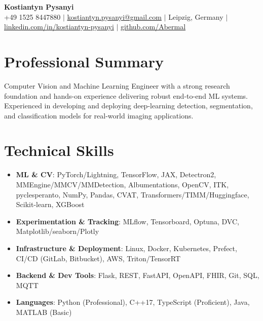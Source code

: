 \documentclass[letterpaper,10pt]{article}
\newcommand{\resumeItem}[1]{
    \item\small{#1}\vspace{-0.5pt}
}
\newcommand{\resumeSubHeadingList}{\begin{itemize}[leftmargin=0.15in, label={}]\vspace{-2pt}}
\newcommand{\resumeSubHeadingListEnd}{\end{itemize}}
\begin{document}
\begin{center}
  \textbf{\Huge Kostiantyn Pysanyi}\vspace{4pt} \\
  \small +49 1525 8447880 $|$ \href{mailto:kostiantyn.pysanyi@gmail.com}{kostiantyn.pysanyi@gmail.com} $|$ Leipzig, Germany $|$
  \href{https://www.linkedin.com/in/kostiantyn-pysanyi/}{linkedin.com/in/kostiantyn-pysanyi} $|$ \href{https://github.com/Abermal}{github.com/Abermal}
\end{center}




\section{Professional Summary}
Computer Vision and Machine Learning Engineer with a strong research foundation and hands-on experience delivering robust end-to-end ML systems. Experienced in developing and deploying deep-learning detection, segmentation, and classification models for real-world imaging applications.

\section{Technical Skills}
\resumeSubHeadingList
  \resumeItem{\textbf{ML \& CV}: PyTorch/Lightning, TensorFlow, JAX, Detectron2, MMEngine/MMCV/MMDetection, Albumentations, OpenCV, ITK, pyclesperanto, NumPy, Pandas, CVAT, Transformers/TIMM/Huggingface, Scikit-learn, XGBoost}
  \resumeItem{\textbf{Experimentation \& Tracking}: MLflow, Tensorboard, Optuna, DVC, Matplotlib/seaborn/Plotly}
  \resumeItem{\textbf{Infrastructure \& Deployment}: Linux, Docker, Kubernetes, Prefect, CI/CD (GitLab, Bitbucket), AWS, Triton/TensorRT}
  \resumeItem{\textbf{Backend \& Dev Tools}: Flask, REST, FastAPI, OpenAPI, FHIR, Git, SQL, MQTT}
  \resumeItem{\textbf{Languages}: Python (Professional), C++17, TypeScript (Proficient), Java, MATLAB (Basic)}
\resumeSubHeadingListEnd
\end{document}
